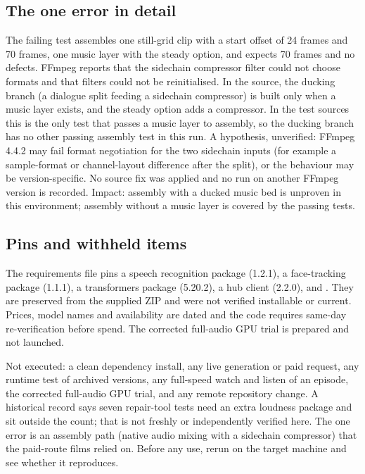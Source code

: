 \documentclass[11pt,a4paper]{article}
\newcommand{\code}[1]{\texttt{\detokenize{#1}}}
\begin{document}
\subsection{The one error in detail}
The failing test assembles one still-grid clip with a start offset of 24 frames and 70 frames, one music layer with the steady option, and expects 70 frames and no defects. FFmpeg reports that the sidechain compressor filter could not choose formats and that filters could not be reinitialised. In the source, the ducking branch (a dialogue split feeding a sidechain compressor) is built only when a music layer exists, and the steady option adds a compressor. In the test sources this is the only test that passes a music layer to assembly, so the ducking branch has no other passing assembly test in this run. A hypothesis, unverified: FFmpeg 4.4.2 may fail format negotiation for the two sidechain inputs (for example a sample-format or channel-layout difference after the split), or the behaviour may be version-specific. No source fix was applied and no run on another FFmpeg version is recorded. Impact: assembly with a ducked music bed is unproven in this environment; assembly without a music layer is covered by the passing tests.

\subsection{Pins and withheld items}
The requirements file pins a speech recognition package (1.2.1), a face-tracking package (1.1.1), a transformers package (5.20.2), a hub client (2.2.0), \code{requests} and \code{Pillow}. They are preserved from the supplied ZIP and were not verified installable or current. Prices, model names and availability are dated and the code requires same-day re-verification before spend. The corrected full-audio GPU trial is prepared and not launched.

Not executed: a clean dependency install, any live generation or paid request, any runtime test of archived versions, any full-speed watch and listen of an episode, the corrected full-audio GPU trial, and any remote repository change. A historical record says seven repair-tool tests need an extra loudness package and sit outside the count; that is not freshly or independently verified here. The one error is an assembly path (native audio mixing with a sidechain compressor) that the paid-route films relied on. Before any use, rerun on the target machine and see whether it reproduces.
\end{document}

